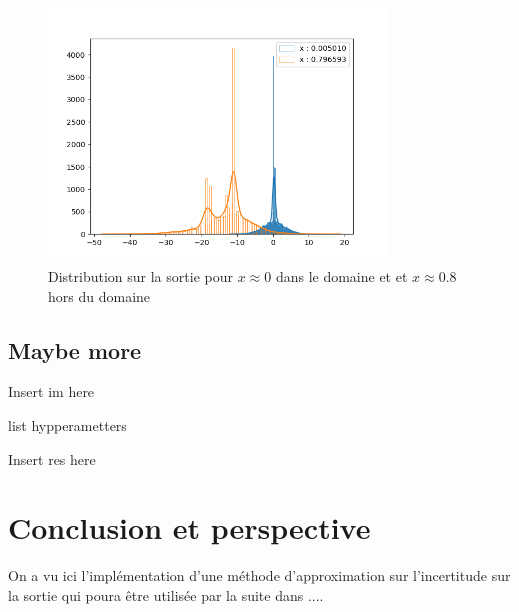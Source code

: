 \documentclass[french,12pt]{article}
\begin{document}
\begin{figure}[H]
    \centering
    \includegraphics[width = 0.8\textwidth]{../plots/plotIncertitudeSortieSin2-12-04-2023_10-48-11--249&329.png}
    \caption{Distribution sur la sortie pour $x \approx 0$ dans le domaine et et $x \approx 0.8$ hors du domaine}
\end{figure}

\subsection{Maybe more}

Insert im here

list hypperametters

Insert res here


\pagebreak
\section{Conclusion et perspective}
On a vu ici l'implémentation d'une méthode d'approximation sur l'incertitude
sur la sortie qui poura être utilisée par la suite dans ....

\pagebreak


\end{document}
